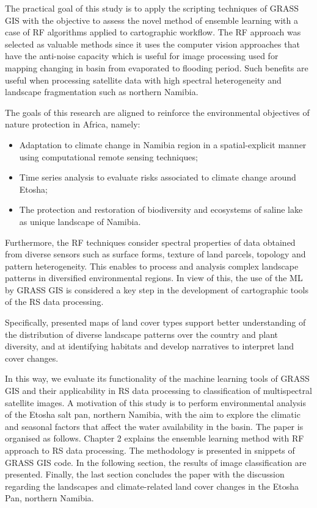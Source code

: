 \documentclass[climate,article,submit,pdftex,moreauthors]{Definitions/mdpi}
\begin{document}
{The {practical }goal of this study is to apply the scripting techniques of GRASS GIS with the objective to assess the novel method of ensemble learning with a case of RF algorithms applied to cartographic workflow. The RF approach was selected as valuable methods since it uses the computer vision approaches that have the anti-noise capacity which is useful for image processing used for mapping changing in basin from evaporated to flooding period. Such benefits are useful when processing satellite data with high spectral heterogeneity and landscape fragmentation such as northern Namibia. 

{The goals of this research are aligned to reinforce the environmental objectives of nature protection in Africa, namely}: 
\begin{itemize}
	\item[i] {Adaptation to climate change in Namibia region in a spatial-explicit manner using computational remote sensing techniques;} 
	\item[ii] {Time series analysis to evaluate risks associated to climate change around Etosha;} 
	\item[iii] {The protection and restoration of biodiversity and ecosystems of saline lake as unique landscape of Namibia.}
\end{itemize}

Furthermore, the RF techniques consider spectral properties of data obtained from diverse sensors such as surface forms, texture of land parcels, topology and pattern heterogeneity. This enables to process and analysis complex landscape patterns in diversified environmental regions. In view of this, the use of the ML by GRASS GIS is considered a key step in the development of cartographic tools of the RS data processing.

Specifically, presented maps of land cover types support better understanding of the distribution of diverse landscape patterns over the country and plant diversity, and at identifying habitats  and develop narratives to interpret land cover changes. }{In this way,} we evaluate its functionality of the machine learning tools of GRASS GIS and their applicability in RS data processing to classification of multispectral satellite images. A motivation of this study is to perform environmental analysis of the Etosha salt pan, northern Namibia, with the aim to explore the climatic and seasonal factors that affect the water availability in the basin. The paper is organised as follows. Chapter 2 explains the ensemble learning method with RF approach to RS data processing. The methodology is presented in snippets of GRASS GIS code. In the following section, the results of image classification are presented. Finally, the last section concludes the paper with the discussion regarding the landscapes and climate-related land cover changes in the Etosha Pan, northern Namibia.
\end{document}
